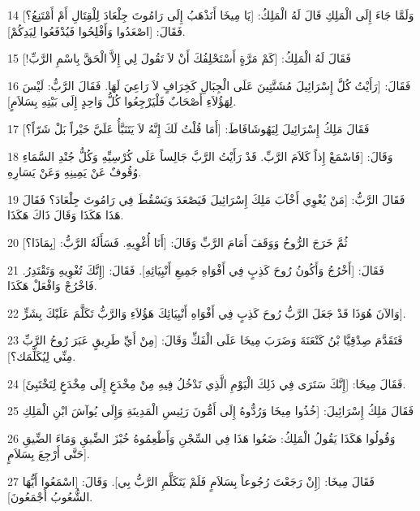 \par 14 وَلَمَّا جَاءَ إِلَى الْمَلِكِ قَالَ لَهُ الْمَلِكُ: [يَا مِيخَا أَنَذْهَبُ إِلَى رَامُوتَ جِلْعَادَ لِلْقِتَالِ أَمْ أَمْتَنِعُ؟] فَقَالَ: [اصْعَدُوا وَأَفْلِحُوا فَيُدْفَعُوا لِيَدِكُمْ].
\par 15 فَقَالَ لَهُ الْمَلِكُ: [كَمْ مَرَّةٍ أَسْتَحْلِفُكَ أَنْ لاَ تَقُولَ لِي إِلاَّ الْحَقَّ بِاسْمِ الرَّبِّ!]
\par 16 فَقَالَ: [رَأَيْتُ كُلَّ إِسْرَائِيلَ مُشَتَّتِينَ عَلَى الْجِبَالِ كَخِرَافٍ لاَ رَاعِيَ لَهَا. فَقَالَ الرَّبُّ: لَيْسَ لِهَؤُلاَءِ أَصْحَابٌ فَلْيَرْجِعُوا كُلُّ وَاحِدٍ إِلَى بَيْتِهِ بِسَلاَمٍ].
\par 17 فَقَالَ مَلِكُ إِسْرَائِيلَ لِيَهُوشَافَاطَ: [أَمَا قُلْتُ لَكَ إِنَّهُ لاَ يَتَنَبَّأُ عَلَيَّ خَيْراً بَلْ شَرّاً؟]
\par 18 وَقَالَ: [فَاسْمَعْ إِذاً كَلاَمَ الرَّبِّ. قَدْ رَأَيْتُ الرَّبَّ جَالِساً عَلَى كُرْسِيِّهِ وَكُلُّ جُنْدِ السَّمَاءِ وُقُوفٌ عَنْ يَمِينِهِ وَعَنْ يَسَارِهِ.
\par 19 فَقَالَ الرَّبُّ: [مَنْ يُغْوِي أَخْآبَ مَلِكَ إِسْرَائِيلَ فَيَصْعَدَ وَيَسْقُطَ فِي رَامُوتَ جِلْعَادَ؟ فَقَالَ هَذَا هَكَذَا وَقَالَ ذَاكَ هَكَذَا.
\par 20 ثُمَّ خَرَجَ الرُّوحُ وَوَقَفَ أَمَامَ الرَّبِّ وَقَالَ: [أَنَا أُغْوِيهِ. فَسَأَلَهُ الرَّبُّ: [بِمَاذَا؟]
\par 21 فَقَالَ: [أَخْرُجُ وَأَكُونُ رُوحَ كَذِبٍ فِي أَفْوَاهِ جَمِيعِ أَنْبِيَائِهِ]. فَقَالَ: [إِنَّكَ تُغْوِيهِ وَتَقْتَدِرُ. فَاخْرُجْ وَافْعَلْ هَكَذَا.
\par 22 وَالآنَ هُوَذَا قَدْ جَعَلَ الرَّبُّ رُوحَ كَذِبٍ فِي أَفْوَاهِ أَنْبِيَائِكَ هَؤُلاَءِ وَالرَّبُّ تَكَلَّمَ عَلَيْكَ بِشَرٍّ].
\par 23 فَتَقَدَّمَ صِدْقِيَّا بْنُ كَنْعَنَةَ وَضَرَبَ مِيخَا عَلَى الْفَكِّ وَقَالَ: [مِنْ أَيِّ طَرِيقٍ عَبَرَ رُوحُ الرَّبِّ مِنِّي لِيُكَلِّمَك؟].
\par 24 فَقَالَ مِيخَا: [إِنَّكَ سَتَرَى فِي ذَلِكَ الْيَوْمِ الَّذِي تَدْخُلُ فِيهِ مِنْ مِخْدَعٍ إِلَى مِخْدَعٍ لِتَخْتَبِئَ].
\par 25 فَقَالَ مَلِكُ إِسْرَائِيلَ: [خُذُوا مِيخَا وَرُدُّوهُ إِلَى أَمُّونَ رَئِيسِ الْمَدِينَةِ وَإِلَى يُوآشَ ابْنِ الْمَلِكِ
\par 26 وَقُولُوا هَكَذَا يَقُولُ الْمَلِكُ: ضَعُوا هَذَا فِي السِّجْنِ وَأَطْعِمُوهُ خُبْزَ الضِّيقِ وَمَاءَ الضِّيقِ حَتَّى أَرْجِعَ بِسَلاَمٍ].
\par 27 فَقَالَ مِيخَا: [إِنْ رَجَعْتَ رُجُوعاً بِسَلاَمٍ فَلَمْ يَتَكَلَّمِ الرَّبُّ بِي]. وَقَالَ: [اسْمَعُوا أَيُّهَا الشُّعُوبُ أَجْمَعُونَ].

